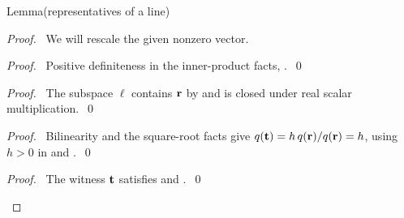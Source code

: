 \begin{mergedproofsection}
\begin{namedresult}{Lemma}{(representatives of a line)}\label{lem:312-representatives}
\end{namedresult}
\begin{proof}
\pfsketch\ We will rescale the given nonzero vector.
\begin{proof}\pf\ Positive definiteness in the inner-product facts,
.~\qed\end{proof}
\begin{proof}\pf\ The subspace $\ell$ contains ${\mathbf r}$ by 
and is closed under real scalar multiplication.~\qed\end{proof}
\begin{proof}\pf\ Bilinearity and the square-root facts give
$q({\mathbf t})=h\,q({\mathbf r})/q({\mathbf r})=h$, using $h>0$ in  and
.~\qed\end{proof}
\qedstep
\begin{proof}\pf\ The witness ${\mathbf t}$ satisfies 
and .~\qed\end{proof}
\end{proof}


\end{mergedproofsection}
